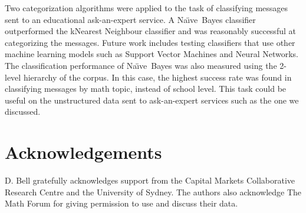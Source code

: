 \documentclass{article}
\newcommand{\naive}{Na\"\i ve}
\begin{document}
Two categorization algorithms were applied to the task of classifying
messages sent to an educational ask-an-expert service.  A \naive\
Bayes classifier outperformed the k\-Nearest Neighbour classifier and
was reasonably successful at categorizing the messages. Future work
includes testing classifiers that use other machine learning models
such as Support Vector Machines and Neural Networks.  The
classification performance of \naive\ Bayes was also measured using the
2-level hierarchy of the corpus. In this case, the highest success
rate was found in classifying messages by math topic, instead of
school level. This task could be useful on the unstructured data sent
to ask-an-expert services such as the one we discussed.

\section*{Acknowledgements}

D. Bell gratefully acknowledges support from the Capital Markets 
Collaborative Research Centre and the University of Sydney. The authors also 
acknowledge The Math Forum for giving permission to use and discuss their data. 



\end{document}
